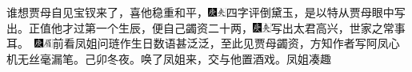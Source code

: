谁想贾母自见宝钗来了，喜他稳重和平，{\includegraphics[width=3mm]{../Images/00004}\includegraphics[width=3mm]{../Images/00012}\footnotesize \kaishu 四字评倒黛玉，是以特从贾母眼中写出。}正值他才过第一个生辰，便自己蠲资二十两，{\includegraphics[width=3mm]{../Images/00004}\includegraphics[width=3mm]{../Images/00012}\footnotesize \kaishu 写出太君高兴，世家之常事耳。　{\includegraphics[width=3mm]{../Images/00004}\includegraphics[width=3mm]{../Images/00010}\footnotesize \kaishu 前看凤姐问琏作生日数语甚泛泛，至此见贾母蠲资，方知作者写阿凤心机无丝毫漏笔。己卯冬夜。}}唤了凤姐来，交与他置酒戏。凤姐凑趣